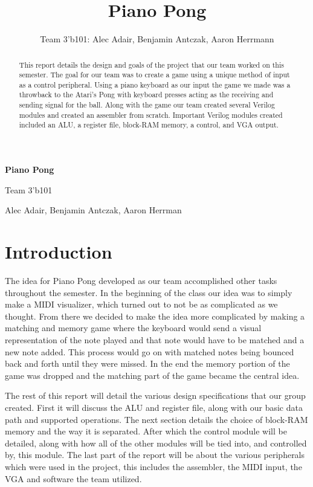\documentclass[onecolumn, 12pt]{IEEEtran}
\begin{document}
\begin{titlepage}
	\centering
	\vspace*{8cm}
	{\Huge\bfseries Piano Pong \par}
	
	{\LARGE Team 3'b101\par}
	{\large Alec Adair, Benjamin Antczak, Aaron Herrman\par}

	\vfill

\end{titlepage}

\title{Piano Pong}
\author{Team 3'b101: Alec Adair, Benjamin Antczak, Aaron Herrmann}
\maketitle

\begin{abstract}
This report details the design and goals of the project that our team worked on this semester.  The goal for our team was to create a game using a unique method of input as a control peripheral.  Using a piano keyboard as our input the game we made was a throwback to the Atari's Pong with keyboard presses acting as the receiving and sending signal for the ball.  Along with the game our team created several Verilog modules and created an assembler from scratch.  Important Verilog modules created included an ALU, a register file, block-RAM memory, a control, and VGA output.  
\end{abstract}

\section{Introduction}
The idea for Piano Pong developed as our team accomplished other tasks throughout the semester.  In the beginning of the class our idea was to simply make a MIDI visualizer, which turned out to not be as complicated as we thought.  From there we decided to make the idea more complicated by making a matching and memory game where the keyboard would send a visual representation of the note played and that note would have to be matched and a new note added.  This process would go on with matched notes being bounced back and forth until they were missed.  In the end the memory portion of the game was dropped and the matching part of the game became the central idea.
\par
The rest of this report will detail the various design specifications that our group created.  First it will discuss the ALU and register file, along with our basic data path and supported operations.  The next section details the choice of block-RAM memory and the way it is separated.  After which the control module will be detailed, along with how all of the other modules will be tied into, and controlled by, this module.  The last part of the report will be about the various peripherals which were used in the project, this includes the assembler, the MIDI input, the VGA and software the team utilized.
\end{document}
